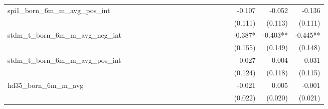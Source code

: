 \begin{tabular}{lrrrrrrrrrrrrrrrrrr}
spi1\_born\_6m\_m\_avg\_pos\_int            &             &             &             &             &             &             &             &             &             &             &             &             &             &             &             &      -0.107 &      -0.052 &      -0.136 \\ 
                                            &             &             &             &             &             &             &             &             &             &             &             &             &             &             &             &     (0.111) &     (0.113) &     (0.111) \\ 
stdm\_t\_born\_6m\_m\_avg\_neg\_int         &             &             &             &             &             &             &             &             &             &             &             &             &             &             &             &     -0.387* &    -0.403** &    -0.445** \\ 
                                            &             &             &             &             &             &             &             &             &             &             &             &             &             &             &             &     (0.155) &     (0.149) &     (0.148) \\ 
stdm\_t\_born\_6m\_m\_avg\_pos\_int         &             &             &             &             &             &             &             &             &             &             &             &             &             &             &             &       0.027 &      -0.004 &       0.031 \\ 
                                            &             &             &             &             &             &             &             &             &             &             &             &             &             &             &             &     (0.124) &     (0.118) &     (0.115) \\ 
hd35\_born\_6m\_m\_avg                      &             &             &             &             &             &             &             &             &             &             &             &             &             &             &             &      -0.021 &       0.005 &      -0.001 \\ 
                                            &             &             &             &             &             &             &             &             &             &             &             &             &             &             &             &     (0.022) &     (0.020) &     (0.021) \\ 

\end{tabular}
